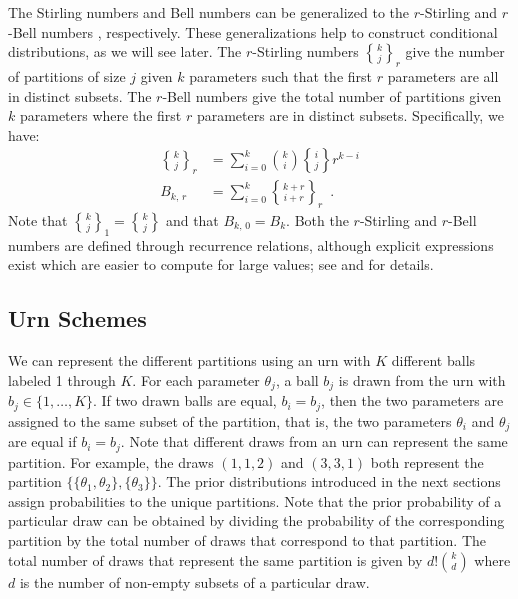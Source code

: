 \documentclass[11pt,a4paper]{article}
\theoremstyle{definition} %
\theoremstyle{case}
\DeclareRobustCommand{\stirling}{\genfrac\{\}{0pt}{}}
\newcommand{\rstirling}[3]{\stirling{#1}{#2}_{#3}}
\newcommand{\bellnum}[1]{B_{#1}}
\newcommand{\rbellnum}[2]{B_{#1,\,#2}}
\begin{document}
The Stirling numbers and Bell numbers can be generalized to the $r$-Stirling \parencite{broder1984r} and $r$-Bell numbers \parencite{mezo2011r}, respectively. These generalizations help to construct conditional distributions, as we will see later. The $r$-Stirling numbers $\rstirling{k}{j}{r}$ give the number of partitions of size $j$ given $k$ parameters such that the first $r$ parameters are all in distinct subsets. The $r$-Bell numbers give the total number of partitions given $k$ parameters where the first $r$ parameters are in distinct subsets. Specifically, we have:
\begin{align}
    \rstirling{k}{j}{r} &= \sum_{i=0}^k \binom{k}{i}\stirling{i}{j}r^{k-i}\\
    \rbellnum{k}{r} &= \sum_{i=0}^k \rstirling{k+r}{i+r}{r} \enspace .
\end{align}
Note that $\rstirling{k}{j}{1} = \stirling{k}{j}$ and that $\rbellnum{k}{0} = \bellnum{k}$. Both the $r$-Stirling and $r$-Bell numbers are defined through recurrence relations, although explicit expressions exist which are easier to compute for large values; see \textcite{broder1984r} and \textcite{mezo2011r} for details.

\subsection{Urn Schemes}
We can represent the different partitions using an urn with $K$ different balls labeled 1 through $K$. For each parameter $\theta_j$, a ball $b_j$ is drawn from the urn with $b_j \in \{1, \ldots, K\}$. If two drawn balls are equal, $b_i = b_j$, then the two parameters are assigned to the same subset of the partition, that is, the two parameters $\theta_i$ and $\theta_j$ are equal if $b_i = b_j$. Note that different draws from an urn can represent the same partition. For example, the draws $(1, 1, 2)$ and $(3, 3, 1)$ both represent the partition $\{\{\theta_1, \theta_2\}, \{\theta_3\}\}$. The prior distributions introduced in the next sections assign probabilities to the unique partitions. Note that the prior probability of a particular draw can be obtained by dividing the probability of the corresponding partition by the total number of draws that correspond to that partition. The total number of draws that represent the same partition is given by $d!\binom{k}{d}$ where $d$ is the number of non-empty subsets of a particular draw.
\end{document}
